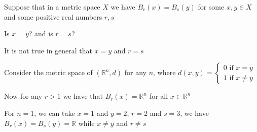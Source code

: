 \documentclass{article}
\begin{document}
\begin{problem}
Suppose that in a metric space \( X \) we have \( B_r(x) = B_s(y) \) for some \( x,y \in X \) and some positive real numbers \( r,s \)

Is \( x= y \)? and is \( r=s \)?

\begin{solution}
	It is not true in general that \( x=y \) and \( r=s \)

	Consider the metric space of \( (\mathbb{R}^n, d) \) for any \( n \), where \( d(x,y) = \begin{cases}
		0 \text{ if } x=y \\
		1 \text{ if } x \neq y
	\end{cases} \)

	Now for any \( r > 1 \) we have that \( B_r(x) = \mathbb{R}^n \) for all \( x \in \mathbb{R}^n \)

	For \( n=1 \), we can take \( x = 1 \) and \( y =  2 \), \( r = 2 \) and \( s = 3 \), we have \( B_r(x) = B_s(y) = \mathbb{R} \) while \( x \neq y \) and \( r \neq s \)
\end{solution}
\end{problem}
\end{document}
